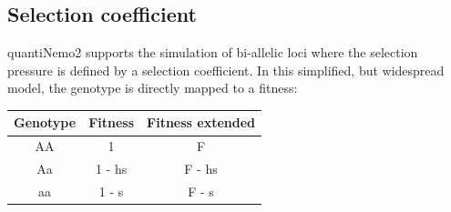 \documentclass[letterpaper,12pt,oneside]{book}
\begin{document}
\subsection{Selection coefficient}
quantiNemo2 supports the simulation of bi-allelic loci where the selection pressure is defined by a selection coefficient. In this simplified, but widespread model, the genotype is directly mapped to a fitness:\\

\begin{tabular}{ccc}
 \hline            
Genotype & Fitness & Fitness extended \\
\hline
AA & 1 			& F      \\
Aa & 1 - hs & F - hs \\
aa & 1 - s 	& F - s  \\
\hline
\end{tabular}
\end{document}
